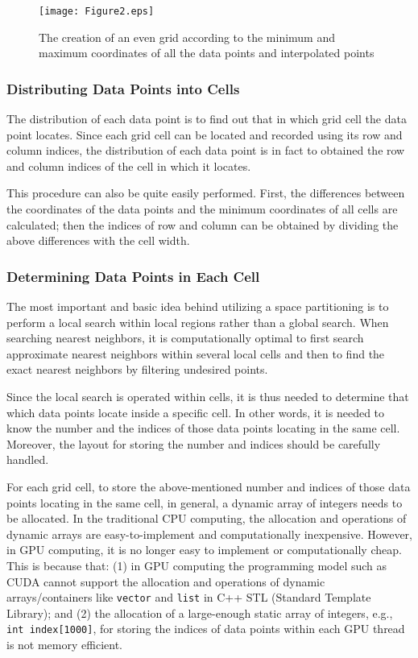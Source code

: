 \documentclass[final,5p,times,twocolumn,authoryear]{elsarticle}
\begin{document}
			\begin{figure}[ht]
							\centering
							\texttt{[image: Figure2.eps]}
							\caption{The creation of an even grid according to the minimum and maximum coordinates of all the data points and interpolated points}
							\label{fig2}
						\end{figure}
			
			\subsubsection{Distributing Data Points into Cells}
			
			The distribution of each data point is to find out that in which grid cell 
			the data point locates. Since each grid cell can be located and recorded 
			using its row and column indices, the distribution of each data point is in 
			fact to obtained the row and column indices of the cell in which it locates. 
			
			This procedure can also be quite easily performed. First, the differences 
			between the coordinates of the data points and the minimum coordinates of 
			all cells are calculated; then the indices of row and column can be obtained 
			by dividing the above differences with the cell width.
			
			\subsubsection{Determining Data Points in Each Cell}
			
			The most important and basic idea behind utilizing a space partitioning is 
			to perform a local search within local regions rather than a global search. 
			When searching nearest neighbors, it is computationally optimal to first 
			search approximate nearest neighbors within several local cells and then to 
			find the exact nearest neighbors by filtering undesired points. 
			
			Since the local search is operated within cells, it is thus needed to 
			determine that which data points locate inside a specific cell. In other 
			words, it is needed to know the number and the indices of those data points 
			locating in the same cell. Moreover, the layout for storing the number and 
			indices should be carefully handled.
			
			For each grid cell, to store the above-mentioned number and indices of those 
			data points locating in the same cell, in general, a dynamic array of 
			integers needs to be allocated. In the traditional CPU computing, the 
			allocation and operations of dynamic arrays are easy-to-implement and 
			computationally inexpensive. However, in GPU computing, it is no longer easy 
			to implement or computationally cheap. This is because that: (1) in GPU 
			computing the programming model such as CUDA cannot support the allocation 
			and operations of dynamic arrays/containers like \texttt{vector} and \texttt{list} in C++ STL 
			(Standard Template Library); and (2) the allocation of a large-enough static 
			array of integers, e.g., \texttt{int index[1000]}, for storing the indices of data 
			points within each GPU thread is not memory efficient. 
			
\end{document}
